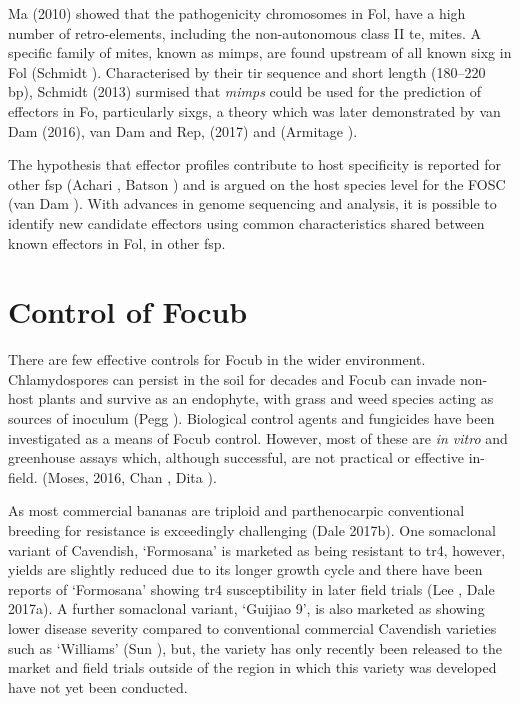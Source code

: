{Ma \et (2010) showed that the pathogenicity chromosomes in \ac{Fol}, have a high number of retro-elements, including the non-autonomous class II \ac{te}, \ac{mites}. A specific family of \ac{mites}, known as \ac{mimp}s, are found upstream of all known \ac{sixg} in \ac{Fol} (Schmidt ). Characterised by their \ac{tir} sequence and short length (180–220 \ac{bp}), Schmidt \et (2013) surmised that \textit{mimps} could be used for the prediction of effectors in \acl{Fo}, particularly \ac{sixg}s, a theory which was later demonstrated by van Dam \et (2016), van Dam and Rep, (2017) and (Armitage ). 

The hypothesis that effector profiles contribute to host specificity is reported for other \ac{fsp} (Achari , Batson ) and is argued on the host species level for the \ac{FOSC} (van Dam ). With advances in genome sequencing and analysis, it is possible to identify new candidate effectors using common characteristics shared between known effectors in \ac{Fol}, in other \ac{fsp}.

\section{Control of \acl{Focub}}

There are few effective controls for \ac{Focub} in the wider environment. Chlamydospores can persist in the soil for decades and \ac{Focub} can invade non-host plants and survive as an endophyte, with grass and weed species acting as sources of inoculum (Pegg ). Biological control agents and fungicides have been investigated as a means of \ac{Focub} control. However, most of these are \textit{in vitro} and greenhouse assays which, although successful, are not practical or effective in-field. (Moses, 2016, Chan , Dita ).  

As most commercial bananas are triploid and parthenocarpic conventional breeding for resistance is exceedingly challenging (Dale \et 2017b). One somaclonal variant of Cavendish, ‘Formosana’ is marketed as being resistant to \ac{tr4}, however, yields are slightly reduced due to its longer growth cycle and there have been reports of  ‘Formosana’ showing \ac{tr4} susceptibility in later field trials (Lee , Dale \et 2017a). A further somaclonal variant, ‘Guijiao 9’, is also marketed as showing lower disease severity compared to conventional commercial Cavendish varieties such as ‘Williams’ (Sun ), but, the variety has only recently been released to the market and field trials outside of the region in which this variety was developed have not yet been conducted.  

}
